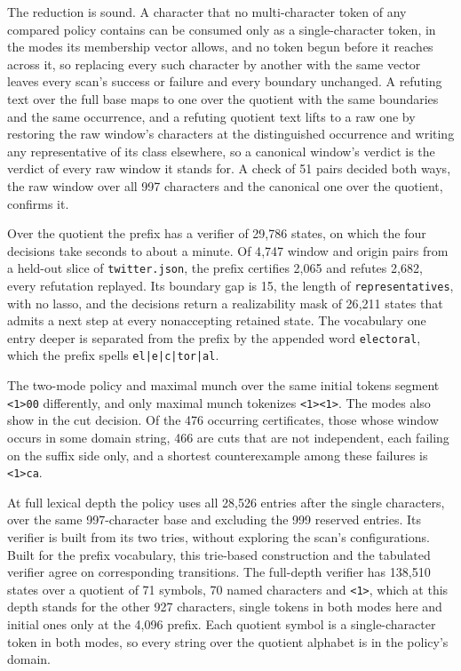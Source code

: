 \documentclass[11pt,a4paper]{article}
\theoremstyle{definition}
\theoremstyle{plain}
\newcommand{\code}[1]{\texttt{#1}}
\begin{document}
The reduction is sound. A character that no multi-character token of any compared policy contains can be consumed only
as a single-character token, in the modes its membership vector allows, and no token begun before it reaches across it,
so replacing every such character by another with the same vector leaves every scan's success or failure and every
boundary unchanged. A refuting text over the full base maps to one over the quotient with the same boundaries and the
same occurrence, and a refuting quotient text lifts to a raw one by restoring the raw window's characters at the
distinguished occurrence and writing any representative of its class elsewhere, so a canonical window's verdict is the
verdict of every raw window it stands for. A check of 51 pairs decided both ways, the raw window over all 997 characters
and the canonical one over the quotient, confirms it.

Over the quotient the prefix has a verifier of 29{,}786 states, on which the four decisions take seconds to about a
minute. Of 4{,}747 window and origin pairs from a held-out slice of \code{twitter.json}, the prefix certifies 2{,}065
and refutes 2{,}682, every refutation replayed. Its boundary gap is 15, the length of \code{representatives}, with no
lasso, and the decisions return a realizability mask of 26{,}211 states that admits a next step at every nonaccepting
retained state. The vocabulary one entry deeper is separated from the prefix by the appended word \code{electoral},
which the prefix spells \code{el|e|c|tor|al}.

The two-mode policy and maximal munch over the same initial tokens segment \code{<1>00} differently, and only maximal
munch tokenizes \code{<1><1>}. The modes also show in the cut decision. Of the 476 occurring certificates, those whose
window occurs in some domain string, 466 are cuts that are not independent, each failing on the suffix side only, and a
shortest counterexample among these failures is \code{<1>ca}.

At full lexical depth the policy uses all 28{,}526 entries after the single characters, over the same 997-character base
and excluding the 999 reserved entries. Its verifier is built from its two tries, without exploring the scan's
configurations. Built for the prefix vocabulary, this trie-based construction and the tabulated verifier agree on
corresponding transitions. The full-depth verifier has 138{,}510 states over a quotient of 71 symbols, 70 named
characters and \code{<1>}, which at this depth stands for the other 927 characters, single tokens in both modes here and
initial ones only at the 4{,}096 prefix. Each quotient symbol is a single-character token in both modes, so every string
over the quotient alphabet is in the policy's domain.
\end{document}
